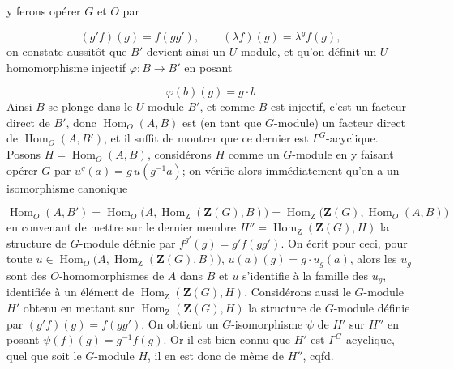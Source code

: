 \clearpage
{}

\noindent y ferons opérer $G$ et $O$ par

\[
(g'f)(g)=f(gg'),
\qquad
(\lambda f)(g)=\lambda^g f(g),
\]
 on constate aussitôt que $B'$ devient ainsi un $U$-module, et qu'on
définit un $U$-homomorphisme injectif $\varphi:B\to B'$ en posant

\[
\varphi(b)(g)=g\mathbin{\cdot}b
\]
Ainsi $B$ se plonge dans le $U$-module $B'$, et comme $B$ est injectif, c'est
un facteur direct de $B'$, donc $\operatorname{Hom}_O(A,B)$ est (en tant que
$G$-module) un facteur direct de $\operatorname{Hom}_O(A,B')$, et il suffit de
montrer que ce dernier est $\Gamma^G$-acyclique.
Posons $H=\operatorname{Hom}_O(A,B)$, considérons $H$ comme un $G$-module en y
faisant opérer $G$ par
$u^g(a)=g\,u(g^{-1}a)$;
on vérifie alors immédiatement qu'on a un isomorphisme canonique

\[
\operatorname{Hom}_O(A,B')
=\operatorname{Hom}_O
  \bigl(A,\operatorname{Hom}_{\mathrm Z}(\mathbf Z(G),B)\bigr)
=\operatorname{Hom}_{\mathrm Z}
  \bigl(\mathbf Z(G),\operatorname{Hom}_O(A,B)\bigr)
\]
 en convenant de mettre sur le dernier membre
$H''=\operatorname{Hom}_{\mathrm Z}(\mathbf Z(G),H)$ la structure de
$G$-module définie par
$f^{g'}(g)=g'f(gg')$.
On écrit pour ceci, pour toute
$u\in\operatorname{Hom}_O
\bigl(A,\operatorname{Hom}_{\mathrm Z}(\mathbf Z(G),B)\bigr)$,
$u(a)(g)=g\mathbin{\cdot}u_g(a)$, alors les $u_g$ sont des
$O$-homomorphismes de $A$ dans $B$ et $u$ s'identifie à la famille des $u_g$,
identifiée à un élément de $\operatorname{Hom}_{\mathrm Z}(\mathbf Z(G),H)$.
Considérons aussi le $G$-module $H'$ obtenu en mettant sur
$\operatorname{Hom}_{\mathrm Z}(\mathbf Z(G),H)$ la structure de $G$-module
définie par
$(g'f)(g)=f(gg')$.
On obtient un $G$-isomorphisme $\psi$ de $H'$ sur $H''$ en posant
$\psi(f)(g)=g^{-1}f(g)$.
Or il est bien connu que $H'$ est $\Gamma^G$-acyclique, quel que soit le
$G$-module $H$, il en est donc de même de $H''$, cqfd.

